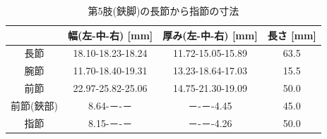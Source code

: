   \begin{table}[htbp]
    \centering
    \caption{第5肢(鋏脚)の長節から指節の寸法}
    \label{tab:5setu}
    \vspace{-3mm}
    \begin{tabular}{|c|c|c|c|}
    \hline
    \multicolumn{1}{|l|}{} & \multicolumn{1}{l|}{幅(左-中-右) {[}mm{]}} & \multicolumn{1}{l|}{厚み(左-中-右) {[}mm{]}} & \multicolumn{1}{l|}{長さ [mm]} \\ \hline
    長節                     & 18.10-18.23-18.24                     & 11.72-15.05-15.89                      & 63.5                        \\ \hline
    腕節                     & 11.70-18.40-19.31                     & 13.23-18.64-17.03                      & 15.5                        \\ \hline
    前節                     & 22.97-25.82-25.06                     & 14.75-21.30-19.09                      & 50.0                        \\ \hline
    前節(鋏部)                 & 8.64-－-－                              & －-－-4.45                          & 45.0                      \\ \hline
    指節                     & 8.15-－-－                              & －-－-4.26                               & 50.0                        \\ \hline
    \end{tabular}
  \end{table}
